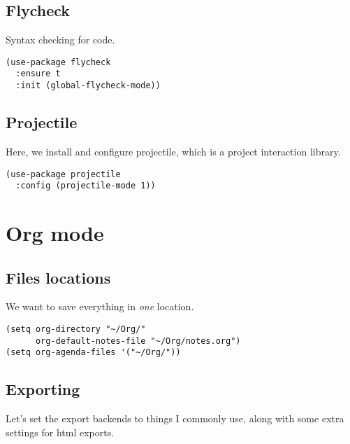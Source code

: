 \documentclass[11pt]{article}
\begin{document}
\subsection*{Flycheck}
\label{sec:org3af136a}

Syntax checking for code.

\begin{verbatim}
(use-package flycheck
  :ensure t
  :init (global-flycheck-mode))
\end{verbatim}

\subsection*{Projectile}
\label{sec:org5194fee}

Here, we install and configure projectile, which is a project interaction library.

\begin{verbatim}
(use-package projectile
  :config (projectile-mode 1))
\end{verbatim}

\section*{Org mode}
\label{sec:org7750414}

\subsection*{Files locations}
\label{sec:org3dc4541}

We want to save everything in \emph{one} location.

\begin{verbatim}
(setq org-directory "~/Org/"
      org-default-notes-file "~/Org/notes.org")
(setq org-agenda-files '("~/Org/"))
\end{verbatim}

\subsection*{Exporting}
\label{sec:org7f9d499}

Let's set the export backends to things I commonly use, along with some extra settings for html exports.
\end{document}
